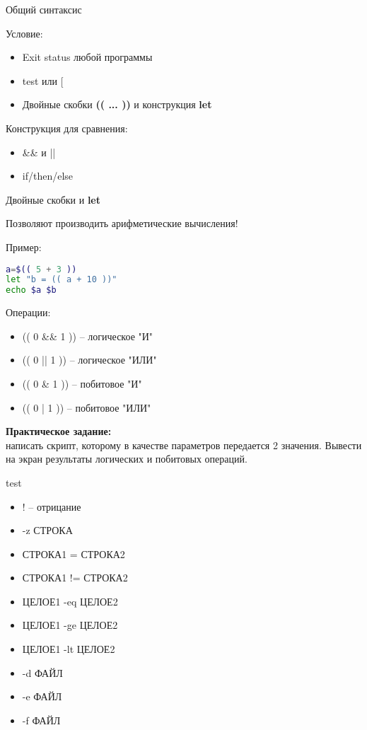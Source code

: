 
\begin{frame}{Общий синтаксис}

	Условие:
	\begin{itemize}
		\item Exit status любой программы
		\item test или $[$ 
		\item Двойные скобки {\bf (( ... ))} и конструкция {\bf let}
	\end{itemize}


	Конструкция для сравнения:
	\begin{itemize}
		\item \&\& и ||
		\item if/then/else
	\end{itemize}

\end{frame}

\begin{frame}[fragile]{Двойные скобки и {\bf let}}

	Позволяют производить арифметические вычисления!

	\pause
	Пример:
\begin{lstlisting}[language=bash]
a=$(( 5 + 3 ))
let "b = (( a + 10 ))"
echo $a $b
\end{lstlisting}

	\pause
	Операции:
	\begin{itemize}
		\item (( 0 \&\& 1 )) -- логическое "И"
		\item (( 0 || 1 )) -- логическое "ИЛИ"
		\item (( 0 \& 1 )) -- побитовое "И"
		\item (( 0 | 1 )) -- побитовое "ИЛИ"
	\end{itemize}

	{\bf Практическое задание:} \\
	написать скрипт, которому в качестве параметров передается 2 значения. Вывести на экран результаты логических и побитовых операций. 
\end{frame}


\begin{frame}[fragile]{test}

	\begin{itemize}
	    \item ! -- отрицание
	    \item -z СТРОКА
	    \item СТРОКА1 = СТРОКА2
	    \item СТРОКА1 != СТРОКА2
	    \item ЦЕЛОЕ1 -eq ЦЕЛОЕ2
	    \item ЦЕЛОЕ1 -ge ЦЕЛОЕ2
	    \item ЦЕЛОЕ1 -lt ЦЕЛОЕ2
	    \item -d ФАЙЛ
	    \item -e ФАЙЛ
	    \item -f ФАЙЛ
	\end{itemize}

\end{frame}

